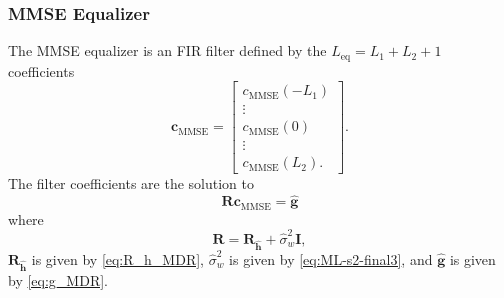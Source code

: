\subsubsection{MMSE Equalizer}
The MMSE equalizer is an FIR filter defined by the $L_\text{eq}=L_1+L_2+1$ coefficients
\begin{equation}
\mathbf{c}_\text{MMSE} = 
\begin{bmatrix}
c_\text{MMSE}(-L_1) \\ \vdots \\ c_\text{MMSE}(0) \\ \vdots \\ c_\text{MMSE}(L_2).
\end{bmatrix}.
\end{equation}
The filter coefficients are the solution to \cite{paq-phase1-report:2014}
\begin{equation}
\mathbf{R} \mathbf{c}_\text{MMSE} = \hat{\mathbf{g}}
\label{eq:start_here_MMSE_MDR}
\end{equation}
where
\begin{equation}
\mathbf{R} = 
\mathbf{R}_{\hat{\mathbf{h}}} + \hat{\sigma}^2_w \mathbf{I},
\end{equation}
$\mathbf{R}_{\hat{\mathbf{h}}}$ is given by \eqref{eq:R_h_MDR}, $\hat{\sigma}^2_w$ is given by \eqref{eq:ML-s2-final3}, and $\hat{\mathbf{g}}$ is given by \eqref{eq:g_MDR}.


